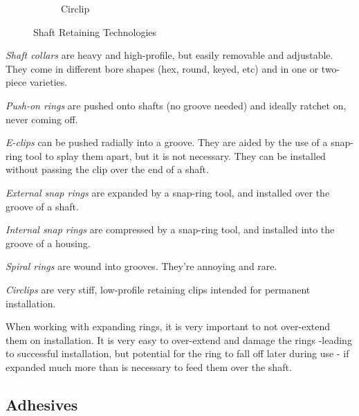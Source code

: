 \documentclass[10pt,letterpaper]{book}
\begin{document}
\begin{figure}[H]
\begin{subfigure}[b]{.24\linewidth}
			\caption{Circlip}
		\end{subfigure}
		\caption{Shaft Retaining Technologies}
	\end{figure}
	
	
	\begin{asparaenum}[a)]
		\item \textit{Shaft collars} are heavy and high-profile, but easily removable and adjustable. They come in different bore shapes (hex, round, keyed, etc) and in one or two-piece varieties.
		\item \textit{Push-on rings} are pushed onto shafts (no groove needed) and ideally ratchet on, never coming off.
		\item \textit{E-clips} can be pushed radially into a groove. They are aided by the use of a snap-ring tool to splay them apart, but it is not necessary. They can be installed without passing the clip over the end of a shaft.
		\item \textit{External snap rings} are expanded by a snap-ring tool, and installed over the groove of a shaft.
		\item \textit{Internal snap rings} are compressed by a snap-ring tool, and installed into the groove of a housing.
		\item \textit{Spiral rings} are wound into grooves. They're annoying and rare.
		\item \textit{Circlips} are very stiff, low-profile retaining clips intended for permanent installation.

	\end{asparaenum}
	
	When working with expanding rings, it is very important to not over-extend them on installation. It is very easy to over-extend and damage the rings -leading to successful installation, but potential for the ring to fall off later during use - if expanded much more than is necessary to feed them over the shaft.
	
	\subsection{Adhesives}
	
\end{document}
